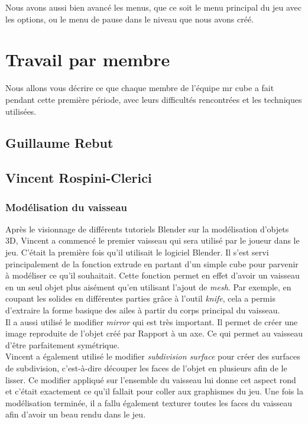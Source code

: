 \documentclass[10pt, titlepage]{report}
\begin{document}
 Nous avons aussi bien avancé les menus, que ce soit le menu principal du jeu avec les options, ou le menu de pause dans le niveau que nous avons créé.

\chapter{Travail par membre}
Nous allons vous décrire ce que chaque membre de l'équipe mr cube a fait pendant cette première période, avec leurs difficultés rencontrées et les techniques utilisées.

\section{Guillaume Rebut}

\section{Vincent Rospini-Clerici}

\subsection{Modélisation du vaisseau}

Après le visionnage de différents tutoriels Blender sur la modélisation d'objets 3D, Vincent a commencé le premier vaisseau qui sera utilisé par le joueur dans le jeu. C'était la première fois qu'il utilisait le logiciel Blender. Il s'est servi principalement de la fonction extrude en partant d'un simple cube pour parvenir à modéliser ce qu'il souhaitait. Cette fonction permet en effet d'avoir un vaisseau en un seul objet plus aisément qu'en utilisant l'ajout de \textit{mesh}. Par exemple, en coupant les solides en différentes parties grâce à l'outil \textit{knife}, cela a permis d'extraire la forme basique des ailes à partir du corps principal du vaisseau.\\

Il a aussi utilisé le modifier \textit{mirror} qui est très important. Il permet de créer une image reproduite de l’objet créé par Rapport à un axe. Ce qui permet au vaisseau d'être parfaitement symétrique.\\

Vincent a également utilisé le modifier \textit{subdivision surface} pour créer des surfaces de subdivision, c’est-à-dire découper les faces de l’objet en plusieurs afin de le lisser. Ce modifier appliqué sur l’ensemble du vaisseau lui donne cet aspect rond et c’était exactement ce qu’il fallait pour coller aux graphismes du jeu.
Une fois la modélisation terminée, il a fallu également texturer toutes les faces du vaisseau afin d'avoir un beau rendu dans le jeu. \\
\end{document}
